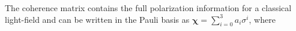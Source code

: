 	
	The coherence matrix contains the full polarization information for a classical light-field and can be written in the Pauli basis as $\mathbf{\chi} = \sum_{i=0}^3 a_i\sigma^{i}$, where


